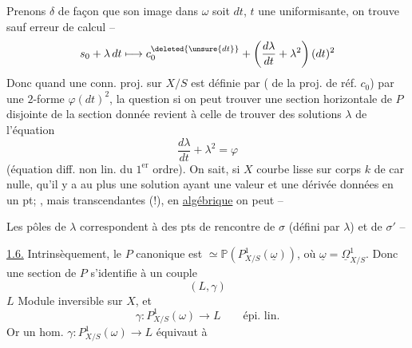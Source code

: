 Prenons $\delta$ de façon que son image dans $\omega$ soit $dt$, $t$ une uniformisante, on trouve sauf erreur de calcul --
\[
s_0+\lambda\,dt\longmapsto c_0^{\deleted{\unsure{dt}}}+\left(\frac{d\lambda}{dt}+\lambda^2\right)(dt)^2
\]
Donc quand une conn. proj. sur $X/S$ est définie par ( de la  proj. de réf. $c_0$) par une $2$-forme $\varphi(dt)^2$, la question si on peut trouver une section horizontale de $P$ disjointe de la section donnée revient à celle de trouver des solutions $\lambda$ de l'équation
\[
\frac{d\lambda}{dt}+\lambda^2=\varphi
\]
(équation diff. non lin. du $1^{\mathrm{er}}$ ordre). On sait, si $X$ courbe lisse sur corps $k$ de car nulle, qu'il y a au plus une solution ayant une valeur et une dérivée données en un pt; , mais transcendantes (!), en \uline{algébrique} on peut  --

Les pôles de $\lambda$  correspondent à des pts de rencontre de $\sigma$  (défini par $\lambda$) et de $\sigma'$ --

\uline{1.6.} Intrinsèquement, le $P$ canonique est $\simeq\mathbb{P}(P^1_{X/S}(\underline{\omega}))$, où $\underline{\omega}=\underline{\Omega}^1_{X/S}$. Donc une section de $P$ s'identifie à un couple
\[
(L,\gamma)
\]
$L$ Module inversible sur $X$, et
\[
\gamma:P^1_{X/S}(\omega)\longrightarrow L\qquad\text{épi. lin.}
\]
Or un hom.  $\gamma:P^1_{X/S}(\omega)\longrightarrow L$ équivaut à
